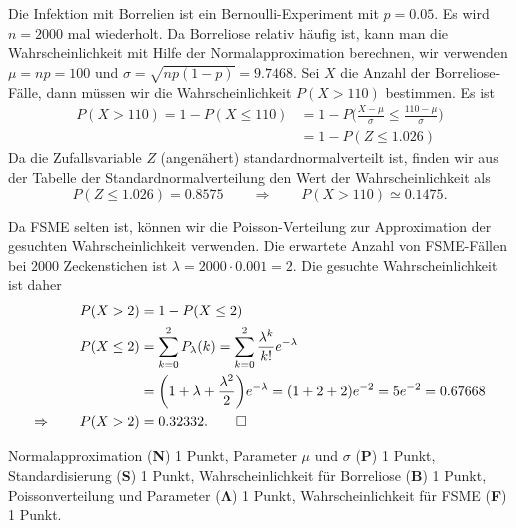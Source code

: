 \begin{loesung}
\begin{teilaufgaben}
\item
Die Infektion mit Borrelien ist ein Bernoulli-Experiment mit $p=0.05$.
Es wird $n=2000$ mal wiederholt.
Da Borreliose relativ häufig ist, kann man die Wahrscheinlichkeit mit
Hilfe der Normalapproximation berechnen, wir verwenden
$\mu=np=100$ und $\sigma=\sqrt{np(1-p)}=9.7468$.
Sei $X$ die Anzahl der Borreliose-Fälle, dann müssen wir die
Wahrscheinlichkeit $P(X>110)$ bestimmen.
Es ist
\begin{align*}
P(X>110)
=
1-P(X\le 110)
&=
1-P\biggl(\frac{X-\mu}{\sigma}\le \frac{110-\mu}{\sigma}\biggr)
\\
&=
1-P(Z\le 1.026)
\end{align*}
Da die Zufallsvariable $Z$ (angenähert) standardnormalverteilt ist, finden wir
aus der Tabelle der Standardnormalverteilung den Wert der Wahrscheinlichkeit
als 
\[ 
P(Z\le 1.026) = 0.8575
\qquad\Rightarrow\qquad
P(X>110)\simeq 0.1475.
\]
\item
Da FSME selten ist, können wir die Poisson-Verteilung zur Approximation der
gesuchten Wahrscheinlichkeit verwenden.
Die erwartete Anzahl von FSME-Fällen bei $2000$ Zeckenstichen ist
$\lambda = 2000\cdot 0.001=2$.
Die gesuchte Wahrscheinlichkeit ist daher
\begin{align*}
P(X>2)
&=
1-P(X\le 2)
\\
P(X\le 2)
&=
\sum_{k=0}^2 P_\lambda(k)
=
\sum_{k=0}^2 \frac{\lambda^k}{k!} e^{-\lambda}
\\
&=
\biggl(1+\lambda+\frac{\lambda^2}2\biggr) e^{-\lambda}
=
(1+2+2) e^{-2}=5e^{-2}
=
0.67668
\\
\Rightarrow\qquad
P(X>2)&=0.32332.
\qedhere
\end{align*}
\end{teilaufgaben}
\end{loesung}

\begin{bewertung}
Normalapproximation ({\bf N}) 1 Punkt,
Parameter $\mu$ und $\sigma$ ({\bf P}) 1 Punkt,
Standardisierung ({\bf S}) 1 Punkt,
Wahrscheinlichkeit für Borreliose ({\bf B}) 1 Punkt,
Poissonverteilung und Parameter ($\mathbf{\Lambda}$) 1 Punkt,
Wahrscheinlichkeit für FSME ({\bf F}) 1 Punkt.
\end{bewertung}


